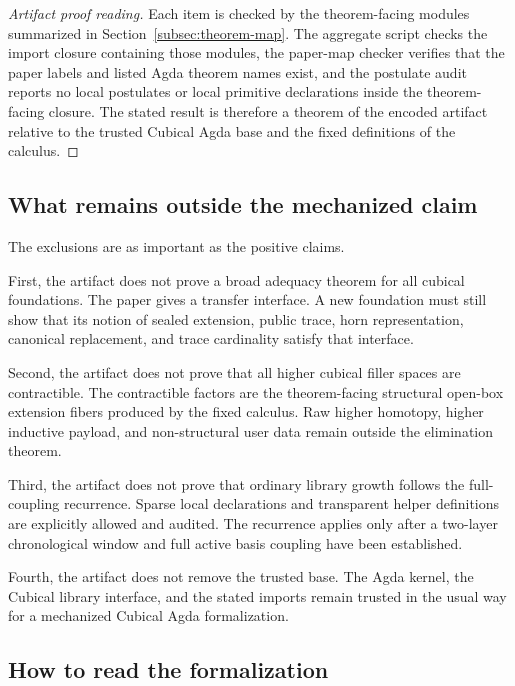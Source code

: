 \begin{proof}[Artifact proof reading]
Each item is checked by the theorem-facing modules summarized in
Section~\ref{subsec:theorem-map}.  The aggregate script checks the import closure containing
those modules, the paper-map checker verifies that the paper labels and listed Agda theorem
names exist, and the postulate audit reports no local postulates or local primitive declarations
inside the theorem-facing closure.  The stated result is therefore a theorem of the encoded
artifact relative to the trusted Cubical Agda base and the fixed definitions of the calculus.
\end{proof}

\subsection{What remains outside the mechanized claim}
\label{subsec:outside-mechanized-claim}

The exclusions are as important as the positive claims.

First, the artifact does not prove a broad adequacy theorem for all cubical foundations.  The
paper gives a transfer interface.  A new foundation must still show that its notion of sealed
extension, public trace, horn representation, canonical replacement, and trace cardinality
satisfy that interface.

Second, the artifact does not prove that all higher cubical filler spaces are contractible.  The
contractible factors are the theorem-facing structural open-box extension fibers produced by the
fixed calculus.  Raw higher homotopy, higher inductive payload, and non-structural user data
remain outside the elimination theorem.

Third, the artifact does not prove that ordinary library growth follows the full-coupling
recurrence.  Sparse local declarations and transparent helper definitions are explicitly allowed
and audited.  The recurrence applies only after a two-layer chronological window and full active
basis coupling have been established.

Fourth, the artifact does not remove the trusted base.  The Agda kernel, the Cubical library
interface, and the stated imports remain trusted in the usual way for a mechanized Cubical Agda
formalization.

\subsection{How to read the formalization}
\label{subsec:how-to-read-formalization}


